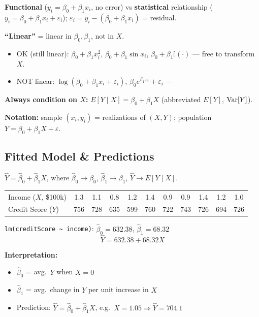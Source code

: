 \textbf{Functional} ($y_i=\beta_0+\beta_1x_i$, no error) vs \textbf{statistical}
relationship ($y_i=\beta_0+\beta_1x_i+\varepsilon_i$); $\varepsilon_i = y_i -
(\beta_0+\beta_1x_i)$ = residual.

\textbf{``Linear''} = linear in $\beta_0,\beta_1$, not in $X$.
\begin{itemize}
    \item OK (still linear): $\beta_0+\beta_1x_i^2$, $\beta_0+\beta_1\sin x_i$, $\beta_0+\beta_1\mathbb{I}(\cdot)$ --- free to transform $X$.
    \item NOT linear: $\log(\beta_0+\beta_1x_i+\varepsilon_i)$, $\beta_0e^{\beta_1x_i}+\varepsilon_i$ --- 
\end{itemize}

\textbf{Always condition on $X$:} $E[Y\mid X]=\beta_0+\beta_1X$
(abbreviated $E[Y]$, $\operatorname{Var}[Y]$). 

\textbf{Notation:} sample $(x_i,y_i)$ = realizations of $(X,Y)$;
population $Y=\beta_0+\beta_1X+\varepsilon$.

\subsection{Fitted Model \& Predictions}

\begin{definition}
    $\hat Y = \hat\beta_0+\hat\beta_1X$, where $\hat\beta_0\to\beta_0$,
    $\hat\beta_1\to\beta_1$, $\hat Y \to E[Y\mid X]$.
\end{definition}

\begin{example}\label{ex:credit}
    \begin{center}
    \begin{tabular}{lcccccccccc}
        \toprule
        Income ($X$, \$100k) & 1.3 & 1.1 & 0.8 & 1.2 & 1.4 & 0.9 & 0.9 & 1.4 & 1.2 & 1.0 \\
        Credit Score ($Y$) & 756 & 728 & 635 & 599 & 760 & 722 & 743 & 726 & 694 & 726 \\
        \bottomrule
    \end{tabular}
    \end{center}
    \texttt{lm(creditScore \textasciitilde{} income)}: $\hat\beta_0=632.38$,
    $\hat\beta_1=68.32$
    \[\hat Y = 632.38+68.32X\]
\end{example}

\textbf{Interpretation:}
\begin{itemize}
    \item $\hat\beta_0$ = avg.\ $Y$ when $X=0$ 
    \item $\hat\beta_1$ = avg.\ change in $Y$ per unit increase in $X$ 
    \item Prediction: $\hat Y=\hat\beta_0+\hat\beta_1X$, e.g.\ $X=1.05\Rightarrow\hat Y=704.1$
\end{itemize}

